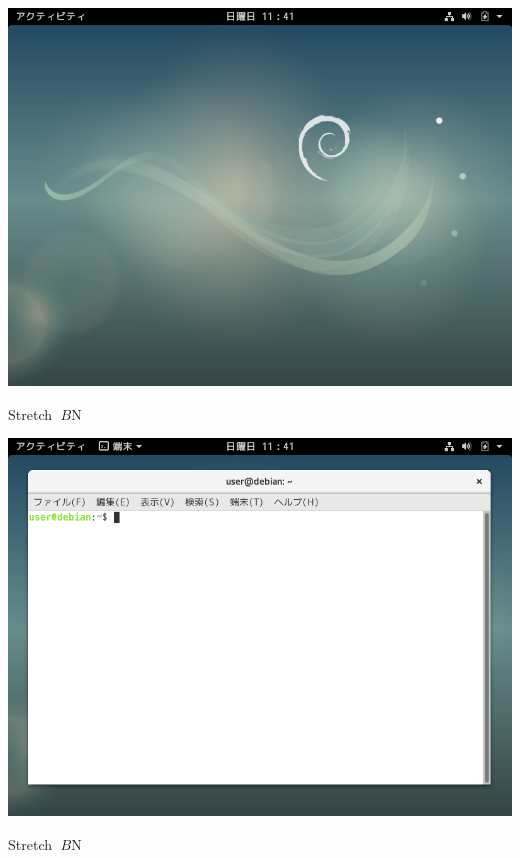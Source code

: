 \documentclass[mingoth,a4paper]{jsarticle}
\begin{document}
{{\begin{center}
\includegraphics[keepaspectratio,width=1\hsize]{image201907/stretch_gnome_1.png}
\end{center}



Stretch $B$N%

\begin{center}
\includegraphics[keepaspectratio,width=1\hsize]{image201907/stretch_gnome_2.png}
\end{center}



Stretch $B$N%

}}
\end{document}
